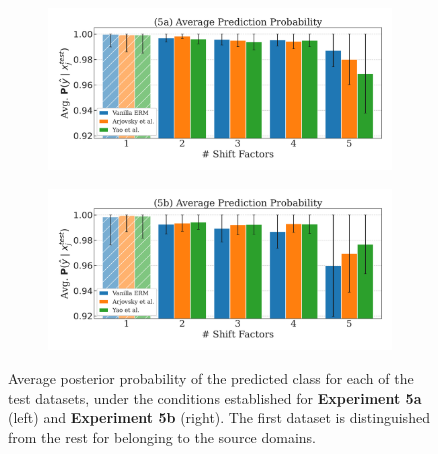 \begin{figure}[H]
    \centering
    \begin{subfigure}[b]{0.48\textwidth}
        \centering
        \includegraphics[width=\textwidth]{img/results_discussion/datashift/posterior_paper_nonpaired.pdf}
    \end{subfigure}
    \hfill
    \begin{subfigure}[b]{0.48\textwidth}
        \centering
        \includegraphics[width=\textwidth]{img/results_discussion/datashift/posterior_paper.pdf}
    \end{subfigure}

    \caption{
    Average posterior probability of the predicted class for each of the test datasets, under the conditions
    established for \textbf{Experiment 5a} (left) and \textbf{Experiment 5b} (right). The first dataset
    is distinguished from the rest for belonging to the source domains.
    }
    \label{fig:pa_datashift_posteriors}
\end{figure}

